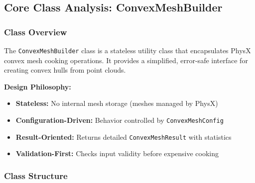 
\subsection{Core Class Analysis: ConvexMeshBuilder}

\subsubsection{Class Overview}

The \texttt{ConvexMeshBuilder} class is a stateless utility class that encapsulates PhysX convex mesh cooking operations. It provides a simplified, error-safe interface for creating convex hulls from point clouds.

\textbf{Design Philosophy:}
\begin{itemize}
    \item \textbf{Stateless:} No internal mesh storage (meshes managed by PhysX)
    \item \textbf{Configuration-Driven:} Behavior controlled by \texttt{ConvexMeshConfig}
    \item \textbf{Result-Oriented:} Returns detailed \texttt{ConvexMeshResult} with statistics
    \item \textbf{Validation-First:} Checks input validity before expensive cooking
\end{itemize}

\subsubsection{Class Structure}

